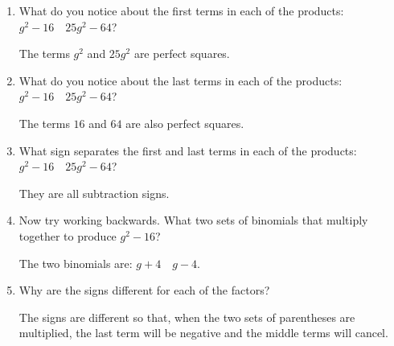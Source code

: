 \begin{enumerate}
  \label{enum:dsb_identification}

  \item What do you notice about the first terms in each of the products:
    $g^{2} - 16 \quad 25g^{2} - 64$?

    The terms $g^{2}$ and $25g^{2}$ are perfect squares. 

  \item What do you notice about the last terms in each of the products:
    $g^{2} - 16 \quad 25g^{2} - 64$?

    The terms $16$ and $64$ are also perfect squares.

  \item What sign separates the first and last terms in each of the products:
    $g^{2} - 16 \quad 25g^{2} - 64$?

    They are all subtraction signs.

  \item Now try working backwards. What two sets of binomials that multiply
    together to produce $g^{2} - 16$?

    The two binomials are: $g + 4 \quad g - 4$.

  \item Why are the signs different for each of the factors?

    The signs are different so that, when the two sets of parentheses are
    multiplied, the last term will be negative and the middle terms will cancel.
\end{enumerate}


